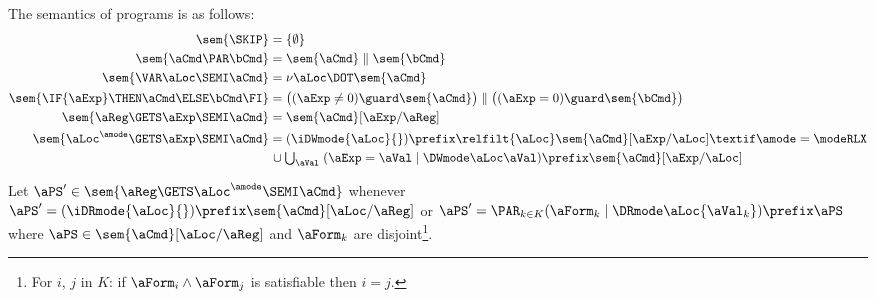 The semantics of programs is as follows: %
\allowdisplaybreaks
\begin{align*}
  \sem{\SKIP} & =
  \{ \emptyset \}
  \\
  \sem{\aCmd \PAR \bCmd} & =
  \sem{\aCmd} \parallel \sem{\bCmd} 
  \\
  \sem{\VAR\aLoc\SEMI \aCmd} & =
  \nu \aLoc \DOT \sem{\aCmd}
  \\  
  \sem{\IF{\aExp} \THEN \aCmd \ELSE \bCmd \FI} & =
  \bigl((\aExp \neq 0) \guard \sem{\aCmd}\bigr) \parallel \bigl((\aExp=0) \guard \sem{\bCmd}\bigr) 
  \\
  \sem{\aReg\GETS\aExp\SEMI \aCmd} & =
  \sem{\aCmd}[\aExp/\aReg] 
  \\
  \sem{\aLoc^\amode\GETS\aExp\SEMI \aCmd} & =
  (\iDWmode{\aLoc}{}) \prefix \relfilt{\aLoc} \sem{\aCmd}[\aExp/\aLoc]
  \textif \amode=\modeRLX
  \\ & \mkern2mu\cup
  \textstyle\bigcup_\aVal\; (\aExp=\aVal \mid \DWmode\aLoc\aVal) \prefix \sem{\aCmd}[\aExp/\aLoc]
\end{align*}

\begin{definition}
  Let $\aPS'\in\sem{\aReg\GETS\aLoc^\amode\SEMI \aCmd}$ whenever\\
  $\aPS'=(\iDRmode{\aLoc}{}) \prefix \sem{\aCmd}[\aLoc/\aReg]$ or
  $\aPS'=\PAR_{k\in K}(\aForm_k \mid \DRmode\aLoc{\aVal_k}) \prefix \aPS$
  where $\aPS\in\sem{\aCmd}[\aLoc/\aReg]$ and $\aForm_k$ are
  disjoint\footnote{For $i$, $j$ in $K$: if $\aForm_i \land \aForm_j$ is
    satisfiable then $i=j$.}.
\end{definition}

